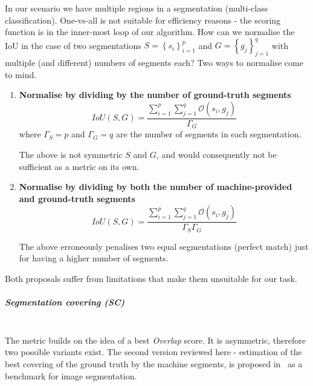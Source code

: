 In our scenario we have multiple regions in a segmentation (multi-class classification). One-vs-all is not suitable for efficiency reasons - the scoring function is in the inner-most loop of our algorithm. How can we normalise the IoU in the case of two segmentations $S=\left\{ {s_{i}}\right\} _{i=1}^{p}$
and $G=\left\{ {g_{j}}\right\} _{j=1}^{q}$ with multiple (and different) numbers of segments each? Two ways to normalise come to mind.

\begin{enumerate}
\item{\textbf{Normalise by dividing by the number of ground-truth segments}}
\begin{equation}
IoU(S,G)=\frac{\sum\limits _{i=1}^{p}\sum\limits _{j=1}^{q}\mathcal{O}\left(s_{i},g_{j}\right)}{\Gamma_{G}}
\end{equation}
where $\Gamma_{S}=p$ and $\Gamma_{G}=q$ are the number of segments in each segmentation.

The above is not symmetric \wrt $S$ and $G$, and would consequently not be sufficient as a metric on its own.

\item{\textbf{Normalise by dividing by both the number of machine-provided and ground-truth segments}}
\begin{equation}
IoU(S,G)=\frac{\sum\limits _{i=1}^{p}\sum\limits _{j=1}^{q}\mathcal{O}\left(s_{i},g_{j}\right)}{\Gamma_{S}\Gamma_{G}}
\end{equation}

The above erroneously penalises two equal segmentations (perfect match) just for having a higher number of segments. %
\end{enumerate}
Both proposals %
suffer from limitations that make them unsuitable for our task.

\subparagraph{Segmentation covering (SC)}\mbox{}\\
The metric builds on the idea of a best \textit{Overlap} score. 
It is asymmetric, therefore two possible variants exist. The second version reviewed here - estimation of the best covering of the ground truth by the machine segments, is proposed in~\cite{Arbelaez09} as a benchmark for image segmentation.

